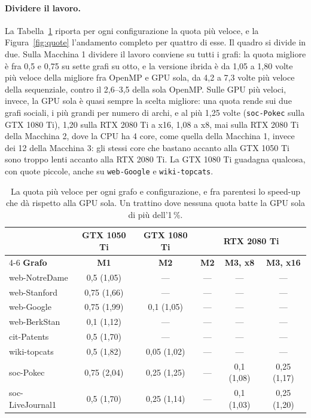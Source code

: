 \documentclass[11pt,a4paper]{article}
\begin{document}
\paragraph{Dividere il lavoro.}
La Tabella~\ref{tab:quote} riporta per ogni configurazione la quota più
veloce, e la Figura~\ref{fig:quote} l'andamento completo per quattro di esse. Il
quadro si divide in due. Sulla Macchina 1 dividere il lavoro conviene su
tutti i grafi: la quota migliore è fra 0,5 e 0,75 su sette grafi su otto, e la
versione ibrida è da 1,05 a 1,80 volte più veloce della migliore fra OpenMP e
GPU sola, da 4,2 a 7,3 volte più veloce della sequenziale, contro il 2,6--3,5
della sola OpenMP. Sulle GPU più veloci, invece, la GPU sola è quasi sempre la
scelta migliore: una quota rende sui due grafi sociali, i più grandi per numero
di archi, e al più 1,25 volte (\texttt{soc-Pokec} sulla GTX 1080 Ti), 1,20
sulla RTX 2080 Ti a x16, 1,08 a x8, mai sulla RTX 2080 Ti della Macchina 2,
dove la CPU ha 4 core, come quella della Macchina 1, invece dei 12 della
Macchina 3: gli stessi core che bastano accanto alla GTX 1050 Ti sono troppo
lenti accanto alla RTX 2080 Ti. La GTX 1080 Ti guadagna qualcosa, con quote piccole, anche su \texttt{web-Google}
e \texttt{wiki-topcats}.

\begin{table}[h]
\centering
\caption{La quota più veloce per ogni grafo e configurazione, e fra parentesi
lo speed-up che dà rispetto alla GPU sola. Un trattino dove nessuna quota
batte la GPU sola di più dell'1\,\%.}
\label{tab:quote}
\small
\begin{tabular}{@{}lccccc@{}}
\toprule
 & \textbf{GTX 1050 Ti} & \textbf{GTX 1080 Ti} &
\multicolumn{3}{c}{\textbf{RTX 2080 Ti}} \\
\cmidrule(l){4-6}
\textbf{Grafo} & \textbf{M1} & \textbf{M2} &
\textbf{M2} & \textbf{M3, x8} & \textbf{M3, x16} \\
\midrule
web-NotreDame    & 0,5 (1,05)  & ---          & --- & ---         & ---         \\
web-Stanford     & 0,75 (1,66) & ---          & --- & ---         & ---         \\
web-Google       & 0,75 (1,99) & 0,1 (1,05)   & --- & ---         & ---         \\
web-BerkStan     & 0,1 (1,12)  & ---          & --- & ---         & ---         \\
cit-Patents      & 0,5 (1,70)  & ---          & --- & ---         & ---         \\
wiki-topcats     & 0,5 (1,82)  & 0,05 (1,02)  & --- & ---         & ---         \\
soc-Pokec        & 0,75 (2,04) & 0,25 (1,25)  & --- & 0,1 (1,08)  & 0,25 (1,17) \\
soc-LiveJournal1 & 0,5 (1,70)  & 0,25 (1,14)  & --- & 0,1 (1,03)  & 0,25 (1,20) \\
\bottomrule
\end{tabular}
\end{table}
\end{document}
